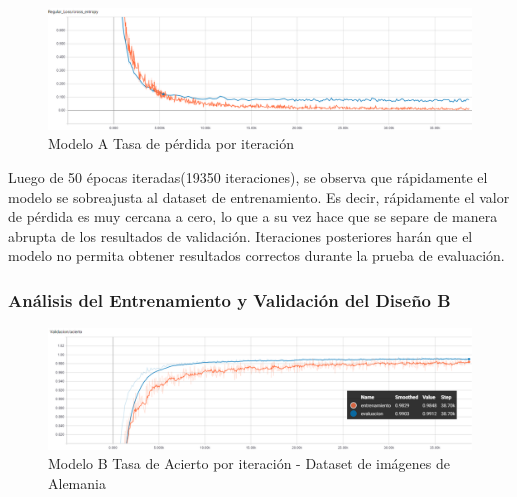 			\begin{figure}[H]
				\begin{center}
				\includegraphics[width=1\textwidth]{images/desarrollo/trainResults/german/model0Loss} 
				\end{center}
				\begin{center}
				\caption{\small{Modelo A Tasa de pérdida por iteración}}
				
				{\small{\fontsize{10}{16.8}\selectfont {Fuente: Elaboración propia}}}
				\end{center}
				\vspace{-1.5em}
			\end{figure}

			Luego de 50 épocas iteradas(19350 iteraciones), se observa que rápidamente el modelo se sobreajusta al dataset de entrenamiento. Es decir, rápidamente el valor de pérdida es muy cercana a cero, lo que a su vez hace que se separe de manera abrupta de los resultados de validación. Iteraciones posteriores harán que el modelo no permita obtener resultados correctos durante la prueba de evaluación.


		\subsubsection{Análisis del Entrenamiento y Validación del Diseño B}  
		
			\begin{figure}[H]
				\begin{center}
				\includegraphics[width=1\textwidth]{images/desarrollo/trainResults/german/model1Acierto} 
				\end{center}
				\begin{center}
				\caption{\small{Modelo B Tasa de Acierto por iteración - Dataset de imágenes de Alemania  }}
				
				{\small{\fontsize{10}{16.8}\selectfont {Fuente: Elaboración propia}}}
				\end{center}
				\vspace{-1.5em}
			\end{figure}
		
